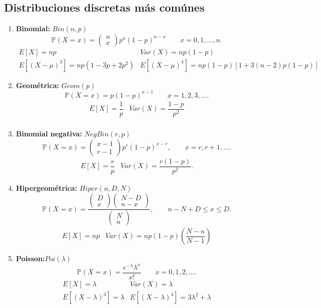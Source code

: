 \documentclass[11pt]{report}
\theoremstyle{break}
\theoremstyle{break}
\begin{document}
\subsection{Distribuciones discretas más comúnes}
\label{seccion: distribuciones discretas}
\begin{enumerate}[label=\alph*)]
\item \textbf{Binomial:} $Bin(n,p)$
$$
\mathbb{P}(X=x) = \begin{pmatrix}
n \\
x
\end{pmatrix} p^{x}(1 - p)^{n -x} \qquad x=0,1,\ldots,n.
$$
$$
\begin{matrix}
E[X] = np & Var(X) = np(1-p) \\
E[(X - \mu)^3] = np(1-3p+2p^2) & E[(X - \mu)^4] = np(1-p)[1 + 3(n-2)p(1-p)]
\end{matrix}
$$
\item \textbf{Geométrica:} $Geom(p)$
$$
\mathbb{P}(X = x) = p(1-p)^{x-1} \qquad x=1,2,3,\ldots.
$$
$$
\begin{matrix}
E[X] = \dfrac{1}{p} & Var(X) = \dfrac{1-p}{p^2} \\
\end{matrix}
$$
\item \textbf{Binomial negativa:} $NegBin(r,p)$
$$
\mathbb{P}(X=x) = \begin{pmatrix}
x-1 \\
r-1
\end{pmatrix} p^{r}(1-p)^{x-r}, \qquad x=r,r+1,\ldots.
$$
$$
\begin{matrix}
E[X] = \dfrac{r}{p} & Var(X) = \dfrac{r(1-p)}{p^2}.
\end{matrix}
$$
\item \textbf{Hipergeométrica:} $Hiper(n,D,N)$
$$
\mathbb{P}(X = x) = \dfrac{ \begin{pmatrix}
D \\
x
\end{pmatrix} \begin{pmatrix}
N-D \\
n-x
\end{pmatrix} }{ \begin{pmatrix}
N \\
n
\end{pmatrix}}, \qquad n-N+D \leq x \leq D.
$$
$$
\begin{matrix}
E[X] = np & Var(X) = np(1-p)\left( \dfrac{N-n}{N-1} \right)
\end{matrix}
$$
\item \textbf{Poisson:}$Poi(\lambda)$
$$
\mathbb{P}(X = x) = \dfrac{e^{-\lambda} \lambda^x }{x!} \qquad x=0,1,2,\ldots. 
$$
$$
\begin{matrix}
E[X] = \lambda & Var(X) = \lambda \\
E[(X-\lambda)^3] = \lambda & E[(X - \lambda)^4] = 3\lambda^2 + \lambda
\end{matrix}
$$
\end{enumerate}
\end{document}
